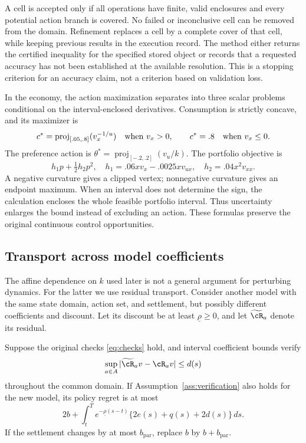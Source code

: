 A cell is accepted only if all operations have finite, valid enclosures and every potential action branch is covered. No failed or inconclusive cell can be removed from the domain. Refinement replaces a cell by a complete cover of that cell, while keeping previous results in the execution record. The method either returns the certified inequality for the specified stored object or records that a requested accuracy has not been established at the available resolution. This is a stopping criterion for an accuracy claim, not a criterion based on validation loss.

In the economy, the action maximization separates into three scalar problems conditional on the interval-enclosed derivatives. Consumption is strictly concave, and its maximizer is
\[
 c^*=\operatorname{proj}_{[.05,.8]}(v_x^{-1/u})\quad\hbox{when }v_x>0,
 \qquad c^*=.8\quad\hbox{when }v_x\leq0.
\]
The preference action is $\theta^*=\operatorname{proj}_{[-.2,.2]}(v_u/k)$. The portfolio objective is
\[
 h_1p+\tfrac12h_2p^2,\quad
 h_1=.06xv_x-.0025xv_{ux},\quad h_2=.04x^2v_{xx}.
\]
A negative curvature gives a clipped vertex; nonnegative curvature gives an endpoint maximum. When an interval does not determine the sign, the calculation encloses the whole feasible portfolio interval. Thus uncertainty enlarges the bound instead of excluding an action. These formulas preserve the original continuous control opportunities.

\subsection{Transport across model coefficients}
The affine dependence on $k$ used later is not a general argument for perturbing dynamics. For the latter we use residual transport. Consider another model with the same state domain, action set, and settlement, but possibly different coefficients and discount. Let its discount be at least $\underline\rho\geq0$, and let $\widetilde\cR_a$ denote its residual.

\begin{proposition}\label{prop:transport}
Suppose the original checks \eqref{eq:checks} hold, and interval coefficient bounds verify
\begin{equation}
 \sup_{a\in A}|\widetilde\cR_a v-\cR_a v|\leq d(s)
 \label{eq:transportmodulus}
\end{equation}
throughout the common domain. If Assumption~\ref{ass:verification} also holds for the new model, its policy regret is at most
\begin{equation}
 2b+\int_t^T e^{-\underline\rho(s-t)}\{2e(s)+q(s)+2d(s)\}\,ds.
 \label{eq:transportbound}
\end{equation}
If the settlement changes by at most $b_\mathrm{par}$, replace $b$ by $b+b_\mathrm{par}$.
\end{proposition}

